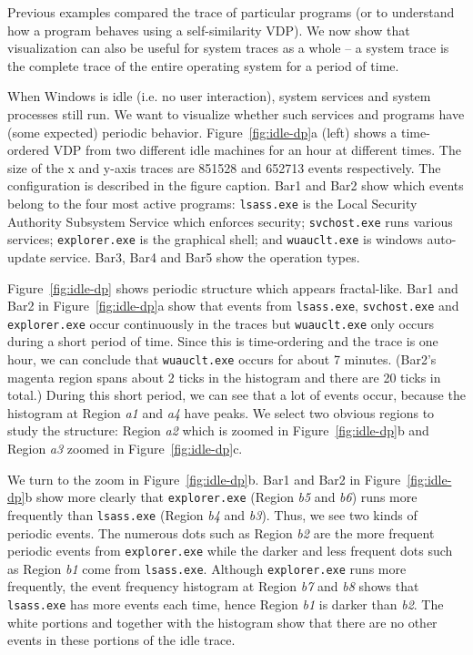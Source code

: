 Previous examples compared the trace of particular programs
(or to understand
how a program behaves using a self-similarity VDP).
We now show that visualization can also be useful for system traces
as a whole -- a system trace is the complete trace of the entire operating
system for a period of time.


When Windows is idle (i.e. no user interaction), 
system services and system processes still run.
We want to visualize whether such services and programs have 
(some expected) periodic behavior.
Figure~\ref{fig:idle-dp}a (left) shows a time-ordered VDP from two
different idle machines for an hour at different times.
The size of the x and y-axis traces are 
851528 and 652713 events respectively.
The configuration is described in the figure caption.
Bar1 and Bar2 show which events belong to
the four most active programs:
{\tt lsass.exe} is the Local Security Authority Subsystem Service which
enforces security;
{\tt svchost.exe} runs various services;
{\tt explorer.exe} is the graphical shell;
and {\tt wuauclt.exe} is windows auto-update service.
Bar3, Bar4 and Bar5 show the operation types.

Figure~\ref{fig:idle-dp} shows periodic structure which appears
fractal-like.
Bar1 and Bar2 in Figure~\ref{fig:idle-dp}a
show that events from {\tt lsass.exe}, {\tt svchost.exe} and {\tt explorer.exe}
occur continuously in the traces but {\tt wuauclt.exe} only occurs
during a short period of time.
Since this is time-ordering and the trace is one hour, we can conclude that
{\tt wuauclt.exe} occurs for about 7 minutes. (Bar2's magenta region
spans about 2
ticks in the histogram and there are 20 ticks in total.)
During this short period, we can see that a lot of events occur,
because the histogram at Region {\em a1} and {\em a4} have peaks.
We select two obvious regions to study the structure:
Region {\em a2} which is zoomed in Figure~\ref{fig:idle-dp}b and
Region {\em a3} zoomed in Figure~\ref{fig:idle-dp}c.

We turn to the zoom in Figure~\ref{fig:idle-dp}b.
Bar1 and Bar2 in
Figure~\ref{fig:idle-dp}b show more clearly that
{\tt explorer.exe} (Region {\em b5} and {\em b6}) runs
more frequently than {\tt lsass.exe} (Region {\em b4} and {\em b3}).
Thus, we see two kinds of periodic events. The numerous dots such
as Region {\em b2} are the more frequent periodic events from 
{\tt explorer.exe} while the darker and less frequent dots such as
Region {\em b1} come from {\tt lsass.exe}.
Although {\tt explorer.exe} runs more frequently,
the event frequency histogram at Region {\em b7} and {\em b8} shows
that {\tt lsass.exe} has more events each time, hence Region {\em b1}
is darker than {\em b2}.
The white portions and together with the histogram show that there
are no other events in these portions of the idle trace.


